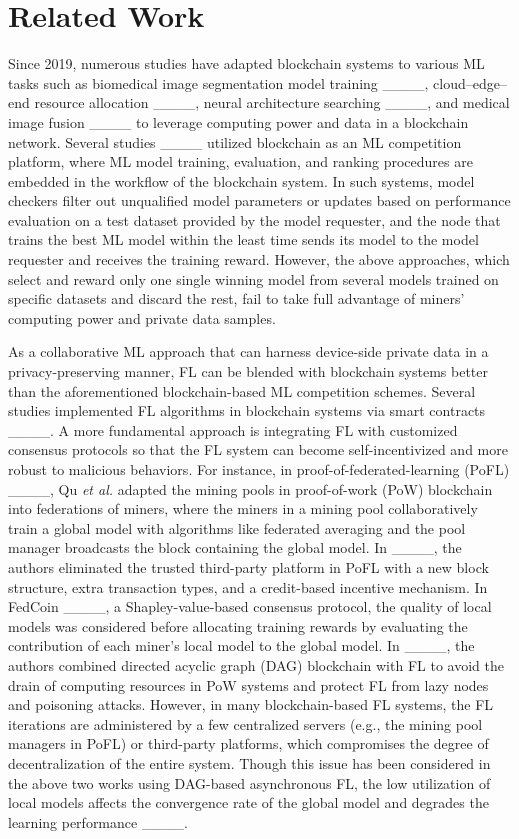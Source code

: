 \section{Related Work\label{sec:Related-Work}
\vspace{-0.1cm}}

Since 2019, numerous studies have adapted blockchain systems to various
ML tasks such as biomedical image segmentation model training ____,
cloud–edge–end resource allocation ____, neural architecture
searching ____, and medical image fusion ____
to leverage computing power and data in a blockchain network.  
Several studies ____
utilized blockchain as an ML competition platform, where ML model
training, evaluation, and ranking procedures are embedded in the workflow
of the blockchain system. In such systems, model checkers filter
out unqualified model parameters or updates based on performance evaluation
on a test dataset provided by the model requester, and the node that
trains the best ML model within the least time sends its model to
the model requester and receives the training reward. However, the
above approaches, which select and reward only one single winning
model from several models trained on specific datasets and discard
the rest, fail to take full advantage of miners' computing power and
private data samples.

As a collaborative ML approach that can harness device-side private
data in a privacy-preserving manner, FL can be blended with blockchain
systems better than the aforementioned blockchain-based ML competition
schemes. Several studies implemented FL algorithms in blockchain systems
via smart contracts ____. A more fundamental
approach is integrating FL with customized consensus protocols so
that the FL system can become self-incentivized and more robust to
malicious behaviors. For instance,  in proof-of-federated-learning
(PoFL) ____, Qu \emph{et al.} adapted the mining pools in
proof-of-work (PoW) blockchain into federations of miners, where the
miners in a mining pool collaboratively train a global model with
algorithms like federated averaging and the pool manager broadcasts
the block containing the global model.  In ____, the
authors eliminated the trusted third-party platform in PoFL with a
new block structure, extra transaction types, and a credit-based incentive
mechanism. In FedCoin ____, a Shapley-value-based
consensus protocol, the quality of local models was considered before
allocating training rewards by evaluating the contribution of each
miner's local model to the global model.  In ____,
the authors combined directed acyclic graph (DAG) blockchain with
FL to avoid the drain of computing resources in PoW systems and protect
FL from lazy nodes and poisoning attacks.   However, in many blockchain-based
FL systems, the FL iterations are administered by a few centralized
servers (e.g., the mining pool managers in PoFL) or  third-party
platforms, which compromises the degree of decentralization of the
entire system. Though this issue has been considered in the above
two works using DAG-based asynchronous FL, the low utilization of
local models affects the convergence rate of the global model and
degrades the learning performance ____.

